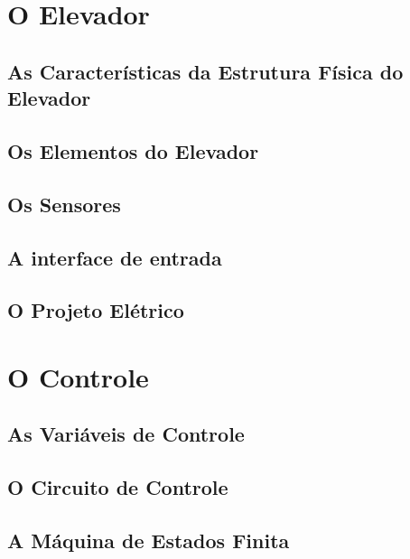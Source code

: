 \section{O Elevador}
\subsection{As Características da Estrutura Física do Elevador}
\subsection{Os Elementos do Elevador}
\subsection{Os Sensores}
\subsection{A interface de entrada}
\subsection{O Projeto Elétrico}




\section{O Controle}
\subsection{As Variáveis de Controle}
\subsection{O Circuito de Controle}
\subsection{A Máquina de Estados Finita}
